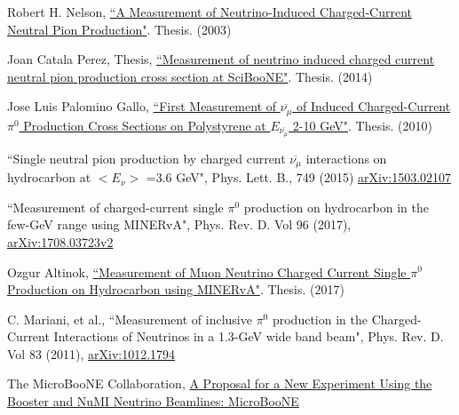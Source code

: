 \begin{thebibliography}{20}
  Robert H. Nelson, \href{https://www-boone.fnal.gov/publications/Papers/rhn\_thesis.pdf}{``A Measurement of Neutrino-Induced Charged-Current Neutral Pion Production"}. Thesis. (2003)
 
  Joan Catala Perez, Thesis, \href{http://lss.fnal.gov/archive/thesis/2000/fermilab-thesis-2014-03.pdf}{``Measurement of neutrino induced charged current neutral pion production cross section at SciBooNE"}. Thesis. (2014)  

  Jose Luis Palomino Gallo, \href{http://inspirehep.net/record/1247736/files/fermilab-thesis-2012-56.pdf}{``First Measurement of $\overline{\nu_\mu}$ of Induced Charged-Current $\pi^0$ Production Cross Sections on Polystyrene at $E_{\overline{\nu_\mu}}$ 2-10 GeV"}. Thesis. (2010) 
  
   ``Single neutral pion production by charged current $\overline{\nu_\mu}$ interactions on hydrocarbon at $< E_\nu >$ =3.6 GeV", Phys. Lett. B., 749 (2015) \href{https://arxiv.org/abs/1503.02107}{arXiv:1503.02107}  
  
   ``Measurement of charged-current single $\pi^0$ production on hydrocarbon in the few-GeV range using MINERvA", Phys. Rev. D. Vol 96 (2017), \href{https://arxiv.org/abs/1708.03723}{arXiv:1708.03723v2}

  Ozgur Altinok, \href{http://inspirehep.net/record/1592323/files/fermilab-thesis-2017-08.pdf}{``Measurement of Muon Neutrino Charged Current Single $\pi^0$ Production on Hydrocarbon using MINERvA"}. Thesis. (2017)
  
  C. Mariani, et al., ``Measurement of inclusive $\pi^0$ production in the Charged-Current Interactions of Neutrinos in a 1.3-GeV wide band beam", Phys. Rev. D. Vol 83 (2011), \href{https://arxiv.org/abs/1012.1794}{arXiv:1012.1794}


  The MicroBooNE Collaboration, \href{http://microboone-docdb.fnal.gov/cgi-bin/RetrieveFile?docid=185&filename=MicroBooNE_10152007.pdf&version=1}{A Proposal for a New Experiment Using the Booster and NuMI Neutrino Beamlines: MicroBooNE}


\end{thebibliography}
